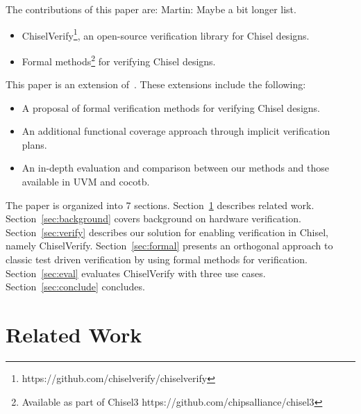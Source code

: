 \documentclass[conference]{IEEEtran}
\newcommand{\todo}[1]{{\color{olive} TODO: #1}}
\newcommand{\martin}[1]{{\color{blue} Martin: #1}}
\newcommand{\hjd}[1]{{\color{pink} Hans: #1}}
\begin{document}
The contributions of this paper are: \martin{Maybe a bit longer list.}
\begin{itemize}
	\item ChiselVerify\footnote{https://github.com/chiselverify/chiselverify}, an open-source verification library for Chisel designs.
	\item Formal methods\footnote{Available as part of Chisel3 https://github.com/chipsalliance/chisel3} for verifying Chisel designs.
\end{itemize}

This paper is an extension of~\cite{ChiselVerify:2021}.
These extensions include the following:

\begin{itemize}
	\item A proposal of formal verification methods for verifying Chisel designs.
	\item An additional functional coverage approach through implicit verification plans.
	\item An in-depth evaluation and comparison between our methods and those available in UVM and cocotb.
\end{itemize}

The paper is organized into 7 sections.
Section~\ref{sec:related} describes related work.
Section~\ref{sec:background} covers background on hardware verification.
Section~\ref{sec:verify} describes our solution for enabling verification in Chisel, namely ChiselVerify.
Section~\ref{sec:formal} presents an orthogonal approach to classic test driven verification by using formal
methods for verification. 
Section~\ref{sec:eval} evaluates ChiselVerify with three use cases.
Section~\ref{sec:conclude} concludes.


\section{Related Work}
\label{sec:related}
\end{document}
